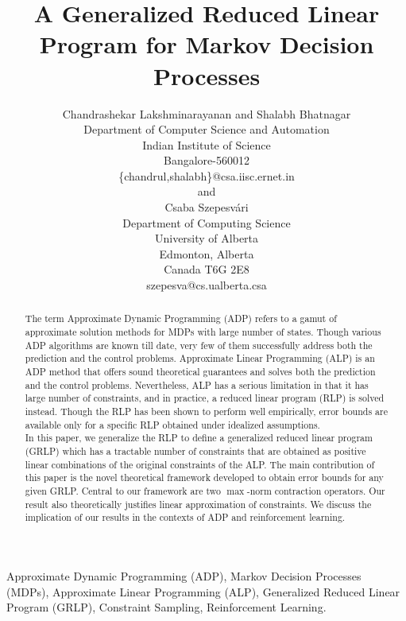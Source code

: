 \documentclass[12pt,draftcls,onecolumn]{IEEEtran}
\title{A Generalized Reduced Linear Program for Markov Decision Processes}
\author{Chandrashekar Lakshminarayanan and Shalabh Bhatnagar\\Department of Computer Science and Automation\\ Indian Institute of Science\\ Bangalore-560012\\\{chandrul,shalabh\}@csa.iisc.ernet.in\\ and \\
Csaba Szepesv\'{a}ri\\Department of Computing Science\\University of Alberta\\Edmonton, Alberta\\Canada T6G 2E8\\  szepesva@cs.ualberta.csa }
\begin{document}
\maketitle
\begin{abstract}
The term Approximate Dynamic Programming (ADP) refers to a gamut of approximate solution methods for MDPs with large number of states. Though various ADP algorithms are known till date, very few of them successfully address both the prediction and the control problems. Approximate Linear Programming (ALP) is an ADP method that offers sound theoretical guarantees and solves both the prediction and the control problems. Nevertheless, ALP has a serious limitation in that it has large number of constraints, and in practice, a reduced linear program (RLP) is solved instead. Though the RLP has been shown to perform well empirically, error bounds are available only for a specific RLP obtained under idealized assumptions.\\
In this paper, we generalize the RLP to define a generalized reduced linear program (GRLP) which has a tractable number of constraints that are obtained as positive linear combinations of the original constraints of the ALP. The main contribution of this paper is the novel theoretical framework developed to obtain error bounds for any given GRLP. Central to our framework are two $\max$-norm contraction operators. Our result also theoretically justifies linear approximation of constraints. We discuss the implication of our results in the contexts of ADP and reinforcement learning.
\end{abstract}
\begin{keywords}{
Approximate Dynamic Programming (ADP), Markov Decision Processes (MDPs), Approximate Linear Programming (ALP), Generalized Reduced Linear Program (GRLP), Constraint Sampling, Reinforcement Learning.}
\end{keywords}
\end{document}
